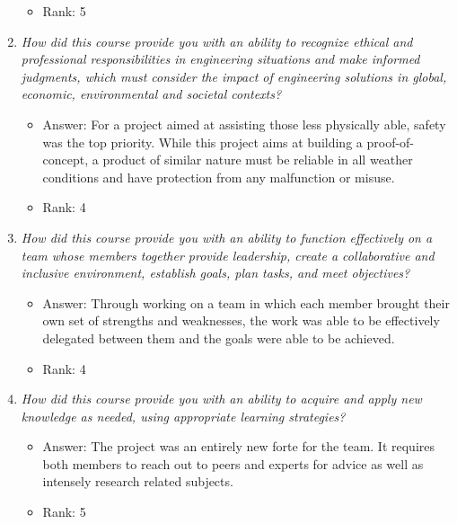 \documentclass[conference]{IEEEtran}
\begin{document}
\begin{enumerate}
\begin{itemize}
        \item Rank: 5
        \vspace{.3cm}
    \end{itemize}
    \item \textit{How did this course provide you with an ability to recognize ethical and professional responsibilities in engineering situations and make informed judgments, which must consider the impact of engineering solutions in global, economic, environmental and societal contexts?}
    \begin{itemize}
        \vspace{.3cm}
        \item Answer: For a project aimed at assisting those less physically able, safety was the top priority. While this project aims at building a proof-of-concept, a product of similar nature must be reliable in all weather conditions and have protection from any malfunction or misuse.
        \item Rank: 4
        \vspace{.3cm}
    \end{itemize}
    \item \textit{ How did this course provide you with an ability to function effectively on a team whose members together provide leadership, create a collaborative and inclusive environment, establish goals, plan tasks, and meet objectives?}
    \begin{itemize}
        \vspace{.3cm}
        \item Answer: Through working on a team in which each member brought their own set of strengths and weaknesses, the work was able to be effectively delegated between them and the goals were able to be achieved.
        \item Rank: 4
        \vspace{.3cm}
    \end{itemize}
    \item \textit{How did this course provide you with an ability to acquire and apply new knowledge as needed, using appropriate learning strategies?}
    \begin{itemize}
        \vspace{.3cm}
        \item Answer: The project was an entirely new forte for the team. It requires both members to reach out to peers and experts for advice as well as intensely research related subjects.
        \item Rank: 5
        \vspace{.3cm}
    \end{itemize}
\end{enumerate}
\twocolumn
\end{document}
